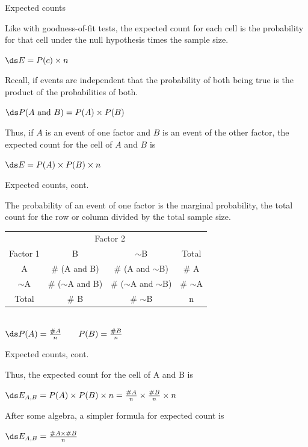 \documentclass[xcolor=table]{beamer}
\begin{document}
\begin{frame}{Expected counts}
\begin{block}{}
\large
Like with goodness-of-fit tests, the expected count for each cell is the probability for that cell under the null hypothesis times the sample size.\\
\medskip
{\centering
$\ds E = P(c) \times n$
\par}
\pause\medskip
Recall, if events are independent that the probability of both being true is the product of the probabilities of both.\\
\medskip
{\centering
$\ds P(A \text{ and } B) = P(A) \times P(B)$
\par}
\pause\medskip
Thus, if $A$ is an event of one factor and $B$ is an event of the other factor, the expected count for the cell of $A$ and $B$ is\\
\medskip
{\centering
$\ds E = P(A) \times P(B) \times n$
\par}
\medskip
\end{block}
\end{frame}

\begin{frame}{Expected counts, cont.}
\begin{block}{}
\large
The probability of an event of one factor is the marginal probability, the total count for the row or column divided by the total sample size.\\
\medskip
{\centering
\begin{tabular}{c | c  c | c}
\multicolumn{1}{c}{} & \multicolumn{2}{c}{Factor 2}\\
Factor 1 & B & $\sim$B & Total\\
\hline
A & \# (A and B) & \# (A and $\sim$B) & \# A\\
$\sim$A & \# ($\sim$A and B) & \# ($\sim$A and $\sim$B) & \# $\sim$A \\
\hline
Total & \# B & \# $\sim$B & n
\end{tabular}\\
\bigskip
$\ds P(A) = \frac {\# A}{n} \qquad P(B) = \frac {\# B} n$
\par}
\smallskip
\end{block}
\end{frame}

\begin{frame}{Expected counts, cont.}
\begin{block}{}
\large
Thus, the expected count for the cell of A and B is\\
\medskip
{\centering
$\ds E_{A,B} = P(A) \times P(B) \times n = \frac {\# A} n \times \frac {\# B} n \times n$
\par}
\pause\bigskip
After some algebra, a simpler formula for expected count is\\
\medskip
{\centering
$\ds E_{A,B}  = \frac{\# A \times \# B}{n}$
\par}
\medskip
\end{block}
\end{frame}
\end{document}
